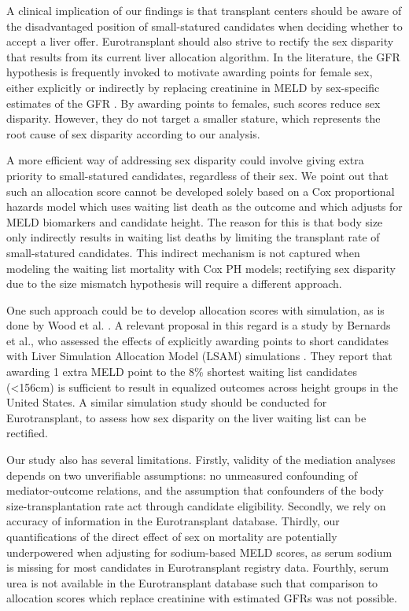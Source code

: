\documentclass[11pt,twoside,]{book}
\begin{document}
A clinical implication of our findings is that transplant centers should be aware of the
disadvantaged position of small-statured candidates when deciding whether to accept
a liver offer. Eurotransplant should also strive to rectify the sex disparity
that results from its current liver allocation algorithm. In the literature, the GFR hypothesis is frequently invoked
to motivate awarding points for female sex, either explicitly
\citep{kimMELD3point0} or indirectly by replacing creatinine in MELD by sex-specific
estimates of the GFR \citep{rodriguezPeralvarezDevelopmentValidationGenderEquity2023, myersGenderRenalFunction2011, asraniMELDGRAILNaGlomerularFiltration2020}.
By awarding points to females, such scores reduce sex disparity. However,
they do not target a smaller stature, which represents the root cause of sex disparity
according to our analysis.
\newpage

A more efficient way of addressing sex disparity could involve giving extra priority
to small-statured candidates, regardless of their sex. We point out that such an
allocation score cannot be developed solely based on a Cox proportional hazards
model which uses waiting list death as the outcome and which adjusts for MELD biomarkers
and candidate height. The reason for this is that body size only indirectly results in waiting list
deaths by limiting the transplant rate of small-statured candidates. This
indirect mechanism is not captured when modeling the waiting
list mortality with Cox PH models; rectifying sex disparity due to the size
mismatch hypothesis will require a different approach.

One such approach could be to develop allocation scores with simulation, as is done
by Wood et al. \citep{woodCorrectingSexDisparity2021}. A relevant proposal in this regard is a study by
Bernards et al., who assessed the effects of explicitly awarding points
to short candidates with Liver Simulation Allocation Model (LSAM) simulations
\citep{bernardsAwardingAdditionalMELD2022}. They report that awarding 1 extra MELD point
to the 8\% shortest waiting list candidates (\textless 156cm) is sufficient to result
in equalized outcomes across height groups in the United States. A similar
simulation study should be conducted for Eurotransplant, to assess how sex
disparity on the liver waiting list can be rectified.

Our study also has several limitations. Firstly, validity of the mediation analyses
depends on two unverifiable assumptions: no unmeasured confounding of mediator-outcome
relations, and the assumption that confounders of the body size-transplantation
rate act through candidate eligibility. Secondly, we rely on accuracy of
information in the Eurotransplant database. Thirdly, our quantifications of the direct
effect of sex on mortality are potentially underpowered when adjusting for
sodium-based MELD scores, as serum sodium is missing for most candidates in Eurotransplant registry
data. Fourthly, serum urea is not available in the Eurotransplant database such that
comparison to allocation scores which replace creatinine with estimated GFRs
was not possible.
\end{document}
